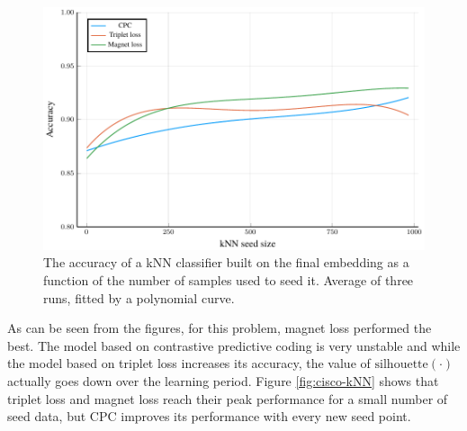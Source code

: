 \begin{figure}[h]
  \centering
  \includegraphics[width=\textwidth]{images/cisco/kNN-poly/cisco-kNN-poly.pdf}
  \caption{The accuracy of a kNN classifier built on the final embedding as a function of the number of samples used to seed it. Average of three runs, fitted by a polynomial curve.}\label{fig:cisco-kNN-poly}
\end{figure}

As can be seen from the figures, for this problem, magnet loss performed the best. The model based on contrastive predictive coding is very unstable and while the model based on triplet loss increases its accuracy, the value of \( \mathrm{silhouette} \left( \cdot \right) \) actually goes down over the learning period. Figure \ref{fig:cisco-kNN} shows that triplet loss and magnet loss reach their peak performance for a small number of seed data, but CPC improves its performance with every new seed point. 
